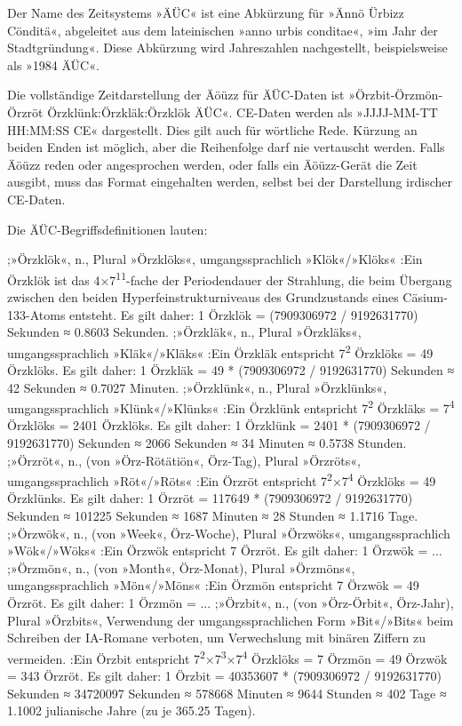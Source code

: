 Der Name des Zeitsystems »ÄÜC« ist eine Abkürzung für »Ännö Ürbizz Cönditä«, abgeleitet aus dem lateinischen »anno urbis conditae«, »im Jahr der Stadtgründung«. Diese Abkürzung wird Jahreszahlen nachgestellt, beispielsweise als »1984 ÄÜC«.

Die vollständige Zeitdarstellung der Äöüzz für ÄÜC-Daten ist »Örzbit-Örzmön-Örzröt Örzklünk:Örzkläk:Örzklök ÄÜC«. CE-Daten werden als »JJJJ-MM-TT HH:MM:SS CE« dargestellt. Dies gilt auch für wörtliche Rede. Kürzung an beiden Enden ist möglich, aber die Reihenfolge darf nie vertauscht werden. Falls Äöüzz reden oder angesprochen werden, oder falls ein Äöüzz-Gerät die Zeit ausgibt, muss das Format eingehalten werden, selbst bei der Darstellung irdischer CE-Daten.

Die ÄÜC-Begriffsdefinitionen lauten:

;»Örzklök«, n., Plural »Örzklöks«, umgangssprachlich »Klök«/»Klöks«
:Ein Örzklök ist das 4×7\textsuperscript{11}-fache der Periodendauer der Strahlung, die beim Übergang zwischen den beiden Hyperfeinstrukturniveaus des Grundzustands eines Cäsium-133-Atoms entsteht. Es gilt daher: 1 Örzklök = (7909306972 / 9192631770) Sekunden ≈ 0.8603 Sekunden.
;»Örzkläk«, n., Plural »Örzkläks«, umgangssprachlich »Kläk«/»Kläks«
:Ein Örzkläk entspricht 7\textsuperscript{2} Örzklöks = 49 Örzklöks. Es gilt daher: 1 Örzkläk = 49 * (7909306972 / 9192631770) Sekunden ≈ 42 Sekunden ≈ 0.7027 Minuten.
;»Örzklünk«, n., Plural »Örzklünks«, umgangssprachlich »Klünk«/»Klünks«
:Ein Örzklünk entspricht 7\textsuperscript{2} Örzkläks = 7\textsuperscript{4} Örzklöks = 2401 Örzklöks. Es gilt daher: 1 Örzklünk = 2401 * (7909306972 / 9192631770) Sekunden ≈ 2066 Sekunden ≈ 34 Minuten ≈ 0.5738 Stunden.
;»Örzröt«, n., (von »Örz-Rötätiön«, Örz-Tag), Plural »Örzröts«, umgangssprachlich »Röt«/»Röts«
:Ein Örzröt entspricht 7\textsuperscript{2}×7\textsuperscript{4} Örzklöks = 49 Örzklünks. Es gilt daher: 1 Örzröt = 117649 * (7909306972 / 9192631770) Sekunden ≈ 101225 Sekunden ≈ 1687 Minuten ≈ 28 Stunden ≈ 1.1716 Tage.
;»Örzwök«, n., (von »Week«, Örz-Woche), Plural »Örzwöks«, umgangssprachlich »Wök«/»Wöks«
:Ein Örzwök entspricht 7 Örzröt. Es gilt daher: 1 Örzwök = ...
;»Örzmön«, n., (von »Month«, Örz-Monat), Plural »Örzmöns«, umgangssprachlich »Mön«/»Möns«
:Ein Örzmön entspricht 7 Örzwök = 49 Örzröt. Es gilt daher: 1 Örzmön = ...
;»Örzbit«, n., (von »Örz-Örbit«, Örz-Jahr), Plural »Örzbits«, Verwendung der umgangssprachlichen Form »Bit«/»Bits« beim Schreiben der IA-Romane verboten, um Verwechslung mit binären Ziffern zu vermeiden.
:Ein Örzbit entspricht 7\textsuperscript{2}×7\textsuperscript{3}×7\textsuperscript{4} Örzklöks = 7 Örzmön = 49 Örzwök = 343 Örzröt. Es gilt daher: 1 Örzbit = 40353607 * (7909306972 / 9192631770) Sekunden ≈ 34720097 Sekunden ≈ 578668 Minuten ≈ 9644 Stunden ≈ 402 Tage ≈ 1.1002 julianische Jahre (zu je 365.25 Tagen).

